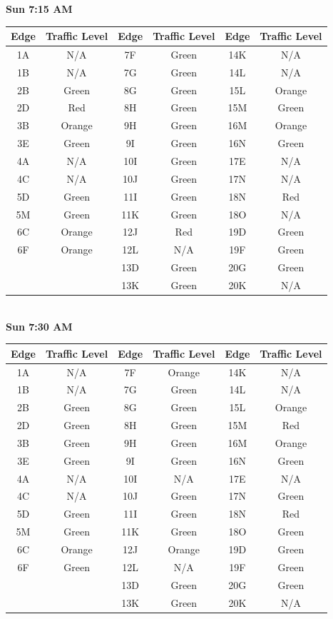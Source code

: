 \documentclass{article}
\begin{document}
\textbf{Sun 7:15 AM} \\

\begin{tabular}{|c|c||c|c||c|c|}\hline
Edge & Traffic Level & Edge & Traffic Level & Edge & Traffic Level \\ \hline
1A & N/A & 7F & Green & 14K & N/A \\ 
1B & N/A & 7G & Green & 14L & N/A \\ \hline
2B & Green & 8G & Green & 15L & Orange \\ 
2D & Red & 8H & Green & 15M & Green \\ \hline
3B & Orange & 9H & Green & 16M & Orange \\ 
3E & Green & 9I & Green & 16N & Green \\ \hline 
4A & N/A & 10I & Green & 17E & N/A \\ 
4C & N/A & 10J & Green & 17N & N/A \\ \hline
5D & Green & 11I & Green & 18N & Red \\ 
5M & Green & 11K & Green & 18O & N/A \\ \hline 
6C & Orange & 12J & Red & 19D & Green \\ 
6F & Orange & 12L & N/A & 19F & Green \\ \hline 
& & 13D & Green & 20G & Green \\
& & 13K & Green & 20K & N/A \\ \hline
\end{tabular} \\

\textbf{Sun 7:30 AM} \\

\begin{tabular}{|c|c||c|c||c|c|}\hline
Edge & Traffic Level & Edge & Traffic Level & Edge & Traffic Level \\ \hline
1A & N/A & 7F & Orange & 14K & N/A \\ 
1B & N/A & 7G & Green & 14L & N/A \\ \hline
2B & Green & 8G & Green & 15L & Orange \\ 
2D & Green & 8H & Green & 15M & Red \\ \hline
3B & Green & 9H & Green & 16M & Orange \\ 
3E & Green & 9I & Green & 16N & Green \\ \hline 
4A & N/A & 10I & N/A & 17E & N/A \\ 
4C & N/A & 10J & Green & 17N & Green \\ \hline
5D & Green & 11I & Green & 18N & Red \\ 
5M & Green & 11K & Green & 18O & Green \\ \hline 
6C & Orange & 12J & Orange & 19D & Green \\ 
6F & Green & 12L & N/A & 19F & Green \\ \hline 
& & 13D & Green & 20G & Green \\
& & 13K & Green & 20K & N/A \\ \hline
\end{tabular} \\
\end{document}
